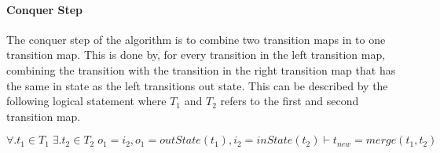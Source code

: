 \paragraph{Conquer Step}
The conquer step of the algorithm is to combine two transition maps in to one
transition map. This is done by, for every transition in the left transition map, combining
the transition with the transition in the right transition map that has the same in state as the
left transitions out state. This can be described by the following logical statement where $T_1$ and $T_2$ refers to the first and second transition map.
\begin{center}
$\forall.t_1\in T_1\;\exists.t_2\in T_2\;o_1=i_2,o_1=outState(t_1),i_2=inState(t_2)
\vdash t_{new}=merge(t_1,t_2)$
\end{center}

